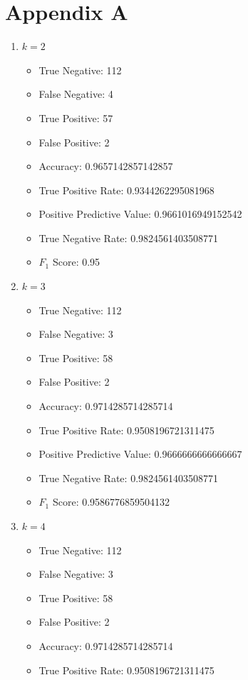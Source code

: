 \documentclass[12pt]{article}
\begin{document}
    \section{Appendix A}
    \begin{enumerate}
    	\item $k = 2$
    	\begin{itemize}
    		\item True Negative: 112
    		\item False Negative: 4
    		\item True Positive: 57
    		\item False Positive: 2
    		\item Accuracy: 0.9657142857142857
    		\item True Positive Rate: 0.9344262295081968
    		\item Positive Predictive Value: 0.9661016949152542
    		\item True Negative Rate: 0.9824561403508771
    		\item $F_1$ Score: 0.95
    	\end{itemize}
        \item $k = 3$
        \begin{itemize}
        	\item True Negative: 112
        	\item False Negative: 3
        	\item True Positive: 58
        	\item False Positive: 2
        	\item Accuracy: 0.9714285714285714
        	\item True Positive Rate: 0.9508196721311475
        	\item Positive Predictive Value: 0.9666666666666667
        	\item True Negative Rate: 0.9824561403508771
        	\item $F_1$ Score: 0.9586776859504132
        \end{itemize}
        \item $k = 4$
        \begin{itemize}
        	\item True Negative: 112
        	\item False Negative: 3
        	\item True Positive: 58
        	\item False Positive: 2
        	\item Accuracy: 0.9714285714285714
        	\item True Positive Rate: 0.9508196721311475

\end{itemize}
\end{enumerate}
\end{document}
